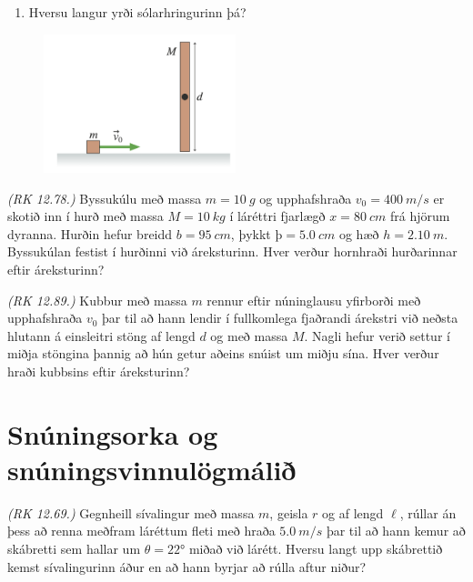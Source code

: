 \ifdefined \wholebook \else\documentclass[oneside]{book}\usepackage{EdlBook}\graphicspath{{figures/}}
\begin{document}
\begin{enumerate}[label = \textbf{Dæmi \thechapter.\arabic*.}]
\begin{enumerate}[label = \textbf{(\alph*)}]
    \item Hversu langur yrði sólarhringurinn þá?
\end{enumerate}

\begin{minipage}{\linewidth}
\begin{figure}
\vspace{-0.75cm}
\includegraphics[width=2.2in]{images/klessahverfi.png}
\end{figure}

\item \textit{(RK 12.78.)} Byssukúlu með massa $m = \SI{10}{g}$ og upphafshraða $v_0 = \SI{400}{m/s}$ er skotið inn í hurð með massa $M = \SI{10}{kg}$ í láréttri fjarlægð $x = \SI{80}{cm}$ frá hjörum dyranna. Hurðin hefur breidd $b = \SI{95}{cm}$, þykkt $þ = \SI{5.0}{cm}$ og hæð $h = \SI{2.10}{m}$. Byssukúlan festist í hurðinni við áreksturinn. Hver verður hornhraði hurðarinnar eftir áreksturinn?

\item \textit{(RK 12.89.)} Kubbur með massa $m$ rennur eftir núninglausu yfirborði með upphafshraða $v_0$ þar til að hann lendir í fullkomlega fjaðrandi árekstri við neðsta hlutann á einsleitri stöng af lengd $d$ og með massa $M$. Nagli hefur verið settur í miðja stöngina þannig að hún getur aðeins snúist um miðju sína. Hver verður hraði kubbsins eftir áreksturinn?


\end{minipage}


\section*{Snúningsorka og snúningsvinnulögmálið}

\item \textit{(RK 12.69.)} Gegnheill sívalingur með massa $m$, geisla $r$ og af lengd $\ell$, rúllar án þess að renna meðfram láréttum fleti með hraða $\SI{5.0}{m/s}$ þar til að hann kemur að skábretti sem hallar um $\theta = \ang{22}$ miðað við lárétt. Hversu langt upp skábrettið kemst sívalingurinn áður en að hann byrjar að rúlla aftur niður?


\end{enumerate}
\end{document}
